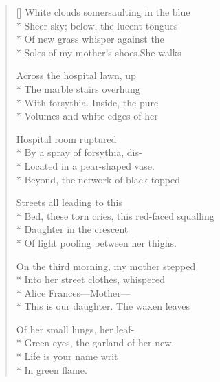 \clearpage
{}
\label{ch:providence}
\settowidth{\versewidth}{Bed, these torn cries, this red-faced squalling}
\begin{verse}[\versewidth]
White clouds somersaulting in the blue\\*
Sheer sky; below, the lucent tongues\\*
Of new grass whisper against the\\*
Soles of my mother's shoes.\quad She walks

Across the hospital lawn, up\\*
The marble stairs overhung\\*
With forsythia.    Inside, the pure\\*
Volumes and white edges of her

Hospital room ruptured\\*
By a spray of forsythia, dis-\\*
Located in a pear-shaped vase.\\*
Beyond, the network of black-topped

Streets all leading to this\\*
Bed, these torn cries, this red-faced squalling\\*
Daughter in the crescent\\*
Of light pooling between her thighs.

On the third morning, my mother stepped\\*
Into her street clothes, whispered\\*
Alice Frances---Mother---\\*
This is our daughter.  The waxen leaves

Of her small lungs, her leaf-\\*
Green eyes, the garland of her new\\*
Life is your name writ\\*
In green flame.
\end{verse}
\endgroup
